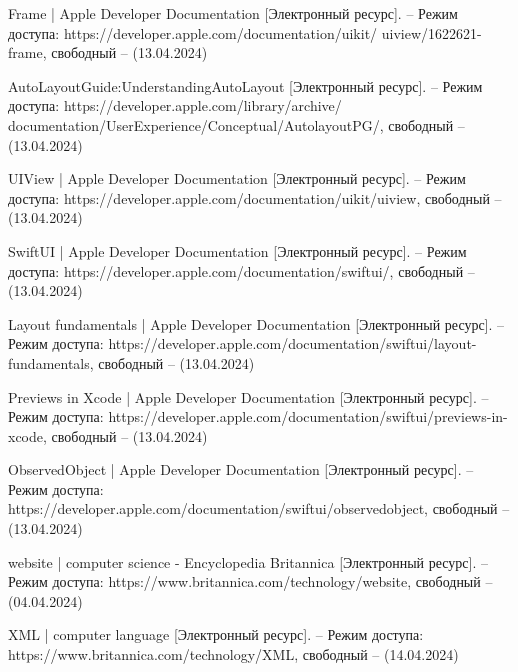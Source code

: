 \begin{thebibliography}{}
	Frame | Apple Developer Documentation [Электронный ресурс]. – Режим доступа: https://developer.apple.com/documentation/uikit/ uiview/1622621-frame,
	свободный – (13.04.2024)
	
	AutoLayoutGuide:UnderstandingAutoLayout [Электронный ресурс]. – Режим доступа: https://developer.apple.com/library/archive/ documentation/UserExperience/Conceptual/AutolayoutPG/,
	свободный – (13.04.2024)
	
	UIView | Apple Developer Documentation [Электронный ресурс]. – Режим доступа: https://developer.apple.com/documentation/uikit/uiview,
	свободный – (13.04.2024)
	
	SwiftUI | Apple Developer Documentation [Электронный ресурс]. – Режим доступа: https://developer.apple.com/documentation/swiftui/, 
	свободный – (13.04.2024)
	
	Layout fundamentals | Apple Developer Documentation [Электронный ресурс]. – Режим доступа: https://developer.apple.com/documentation/swiftui/layout-fundamentals, 
	свободный – (13.04.2024)
	
	Previews in Xcode | Apple Developer Documentation [Электронный ресурс]. – Режим доступа: https://developer.apple.com/documentation/swiftui/previews-in-xcode,
	свободный – (13.04.2024)
	
	ObservedObject | Apple Developer Documentation [Электронный ресурс]. – Режим доступа: https://developer.apple.com/documentation/swiftui/observedobject,
	свободный – (13.04.2024)
	
	website | computer science - Encyclopedia Britannica [Электронный ресурс]. – Режим доступа: https://www.britannica.com/technology/website,
	свободный – (04.04.2024)
	
	XML | computer language [Электронный ресурс]. – Режим доступа: https://www.britannica.com/technology/XML,
	свободный – (14.04.2024)
	

\end{thebibliography}
\endgroup

\pagebreak